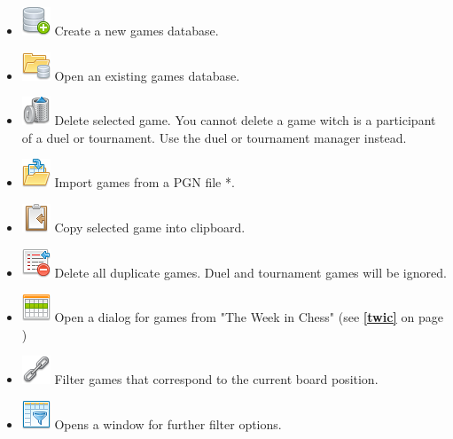 \documentclass[11pt,a4paper]{article}
\begin{document}
\begin{itemize}
	\item \includegraphics[scale=0.5]{database_add.png} Create a new games database.
	\item \includegraphics[scale=0.5]{folder_database.png} Open an existing games database.
	\item \includegraphics[scale=0.5]{bin.png} Delete selected game. You cannot delete a game witch is a participant of a duel or tournament. Use the duel or tournament manager instead.
	\item \includegraphics[scale=0.5]{saved_imports.png} Import games from a PGN file {\color{red}*}.	
	\item \includegraphics[scale=0.5]{clipboard_sign_out.png} Copy selected game into clipboard.		
	\item \includegraphics[scale=0.5]{database_repeat_delete.png} Delete all duplicate games. Duel and tournament games will be ignored.	
	\item \includegraphics[scale=0.5]{outlook_calendar_week.png} Open a dialog for games from "The Week in Chess" (see \textbf{\ref{twic}  } on page \pageref{twic})	
	\item \includegraphics[scale=0.5]{link.png} Filter games that correspond to the current board position.	
	\item \includegraphics[scale=0.5]{table_filter.png} Opens a window for further filter options.		

\end{itemize}
\end{document}
